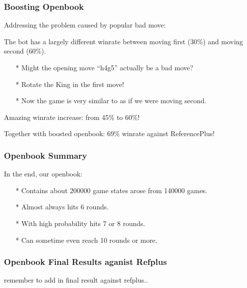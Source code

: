 \documentclass[10pt]{beamer}
\newcommand{\tred}[1]{\textcolor{dred}{#1}}
\begin{document}
	\begin{frame}
		\frametitle{Boosting Openbook}

		Addressing the problem caused by popular bad move:

		The bot has a largely different winrate between moving first (\textcolor{dred}{30\%}) and moving second (\textcolor{fgreen}{60\%}).

		\begin{itemize}
		\item[*] Might the opening move ``h4g5'' actually be a bad move?
		\item[*] Rotate the King in the first move!
		\item[*] Now the game is very similar to as if we were moving second.
		\end{itemize}

		Amazing winrate increase: from \textcolor{dred}{45\%} to \textcolor{fgreen}{60\%}!

		Together with boosted openbook: \textcolor{fgreen}{69\%} winrate against ReferencePlus!
	\end{frame}

	\begin{frame}
		\frametitle{Openbook Summary}

		In the end, our openbook:
		\begin{itemize}
		\item[*] Contains about \textcolor{fgreen}{200000} game states arose from \textcolor{fgreen}{140000} games.
		\item[*] Almost always hits \textcolor{fgreen}{6} rounds.
		\item[*] With high probability hits \textcolor{fgreen}{7} or \textcolor{fgreen}{8} rounds.
		\item[*] Can sometime even reach \textcolor{fgreen}{10} rounds or more.
		\end{itemize}
	\end{frame}

	\begin{frame}
		\frametitle{Openbook Final Results aganist Refplus}

		\tred{remember to add in final result against refplus..}

	\end{frame}

\end{document}
